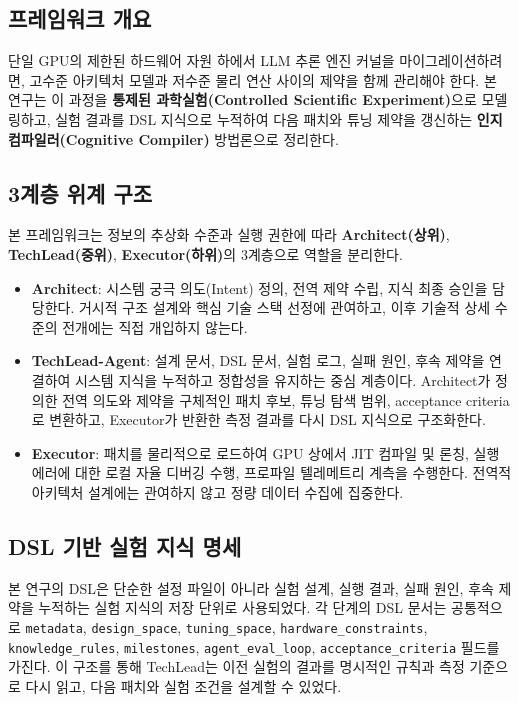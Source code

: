 \documentclass{kcc}            %
\begin{document}
\subsection{프레임워크 개요}
단일 GPU의 제한된 하드웨어 자원 하에서 LLM 추론 엔진 커널을
마이그레이션하려면, 고수준 아키텍처 모델과 저수준 물리 연산 사이의 제약을
함께 관리해야 한다. 본 연구는 이 과정을 \textbf{통제된
과학실험(Controlled Scientific Experiment)}으로 모델링하고, 실험 결과를
DSL 지식으로 누적하여 다음 패치와 튜닝 제약을 갱신하는
\textbf{인지 컴파일러(Cognitive Compiler)} 방법론으로 정리한다.

\subsection{3계층 위계 구조}
본 프레임워크는 정보의 추상화 수준과 실행 권한에 따라
\textbf{Architect(상위)}, \textbf{TechLead(중위)}, \textbf{Executor(하위)}의
3계층으로 역할을 분리한다.

\begin{itemize}
\item \textbf{Architect}: 시스템 궁극 의도(Intent) 정의, 전역 제약 수립,
지식 최종 승인을 담당한다. 거시적 구조 설계와 핵심 기술 스택 선정에
관여하고, 이후 기술적 상세 수준의 전개에는 직접 개입하지 않는다.
\item \textbf{TechLead-Agent}: 설계 문서, DSL 문서, 실험 로그, 실패 원인,
후속 제약을 연결하여 시스템 지식을 누적하고 정합성을 유지하는 중심
계층이다. Architect가 정의한 전역 의도와 제약을 구체적인 패치 후보, 튜닝
탐색 범위, acceptance criteria로 변환하고, Executor가 반환한 측정 결과를
다시 DSL 지식으로 구조화한다.
\item \textbf{Executor}: 패치를 물리적으로 로드하여 GPU 상에서 JIT 컴파일
및 론칭, 실행 에러에 대한 로컬 자율 디버깅 수행, 프로파일 텔레메트리
계측을 수행한다. 전역적 아키텍처 설계에는 관여하지 않고 정량 데이터 수집에
집중한다.
\end{itemize}

\subsection{DSL 기반 실험 지식 명세}
본 연구의 DSL은 단순한 설정 파일이 아니라 실험 설계, 실행 결과, 실패 원인,
후속 제약을 누적하는 실험 지식의 저장 단위로 사용되었다. 각 단계의 DSL
문서는 공통적으로 \texttt{metadata}, \texttt{design\_space},
\texttt{tuning\_space}, \texttt{hardware\_constraints},
\texttt{knowledge\_rules}, \texttt{milestones}, \texttt{agent\_eval\_loop},
\texttt{acceptance\_criteria} 필드를 가진다. 이 구조를 통해 TechLead는 이전
실험의 결과를 명시적인 규칙과 측정 기준으로 다시 읽고, 다음 패치와 실험
조건을 설계할 수 있었다.
\end{document}
